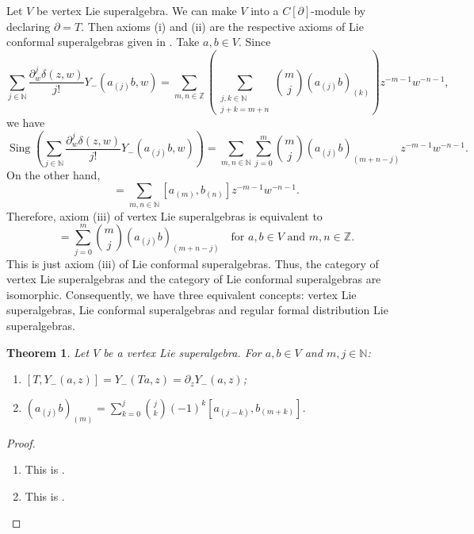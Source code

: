 \documentclass[a4paper, 12pt, reqno]{amsart}
\newtheorem{theorem}{Theorem}[section]
\theoremstyle{remark}
\numberwithin{equation}{subsection}
\DeclareMathOperator{\Sing}{Sing}
\begin{document}
Let $V$ be vertex Lie superalgebra.
We can make $V$ into a $C[\partial]$-module by declaring $\partial = T$.
Then axioms (i) and (ii) are the respective axioms of Lie conformal superalgebras given in .
Take $a, b \in V$.
Since
\begin{equation*}
  \sum_{j \in \mathbb{N}}\frac{\partial^j_w\delta(z, w)}{j!}Y_-(a_{(j)}b, w) = \sum_{m, n \in \mathbb{Z}}\left(\sum_{\substack{j, k \in \mathbb{N} \\ j + k = m + n}}\binom{m}{j}(a_{(j)}b)_{(k)}\right)z^{-m - 1}w^{-n - 1},
\end{equation*}
we have
\begin{equation*}
  \Sing\left(\sum_{j \in \mathbb{N}}\frac{\partial^j_w\delta(z, w)}{j!}Y_-(a_{(j)}b, w)\right) = \sum_{m, n \in \mathbb{N}}\sum_{j = 0}^m\binom{m}{j}(a_{(j)}b)_{(m + n - j)}z^{-m - 1}w^{-n - 1}.
\end{equation*}
On the other hand,
\begin{equation*}
  [Y_-(a, z), Y_-(b, w)] = \sum_{m, n \in \mathbb{N}}[a_{(m)}, b_{(n)}]z^{-m - 1}w^{-n - 1}.
\end{equation*}
Therefore, axiom (iii) of vertex Lie superalgebras is equivalent to
\begin{equation*}
  [a_{(m)}, b_{(n)}] = \sum_{j = 0}^m\binom{m}{j}(a_{(j)}b)_{(m + n - j)} \quad \text{for }a, b \in V\text{ and }m, n \in \mathbb{Z}.
\end{equation*}
This is just axiom (iii) of Lie conformal superalgebras.
Thus, the category of vertex Lie superalgebras and the category of Lie conformal superalgebras are isomorphic.
Consequently, we have three equivalent concepts: vertex Lie superalgebras, Lie conformal superalgebras and regular formal distribution Lie superalgebras.

\begin{theorem}
  \label{thr:45}
  Let $V$ be a vertex Lie superalgebra.
  For $a, b \in V$ and $m, j \in \mathbb{N}$:
  \begin{enumerate}
  \item $[T, Y_-(a, z)] = Y_-(Ta, z) = \partial_zY_-(a, z)$;
  \item $(a_{(j)}b)_{(m)} = \sum_{k = 0}^j\binom{j}{k}(-1)^k[a_{(j - k)}, b_{(m + k)}]$.
  \end{enumerate}
\end{theorem}

\begin{proof}\leavevmode
  \begin{enumerate}
  \item This is .
  \item This is . \qedhere
  \end{enumerate}
\end{proof}
\end{document}
